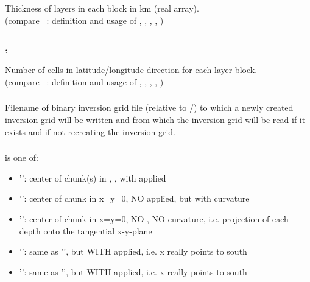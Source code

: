 \subsubsection{}
Thickness of layers in each block in km (real array).\\
(compare ~: definition and usage of , 
, , , )
\subsubsection{, }
Number of cells in latitude/longitude direction for each layer block.\\
(compare ~: definition and usage of , 
, , , )
\subsubsection{}
Filename of binary inversion grid file (relative to /)
to which a newly created inversion grid will be written and from which the inversion grid
will be read if it exists and if not recreating the inversion grid.
\subsubsection{}
 is one of:
\begin{itemize}
\item[]'': center of chunk(s) in , , with applied 
\item[]'': center of chunk in x=y=0, NO  applied, but with curvature
\item[]'': center of chunk in x=y=0, NO , NO curvature, i.e. projection of each depth onto the tangential x-y-plane
\item[]'': same as '', but WITH  applied, i.e. x really points to south
\item[]'': same as '', but WITH  applied, i.e. x really points to south
\end{itemize}
